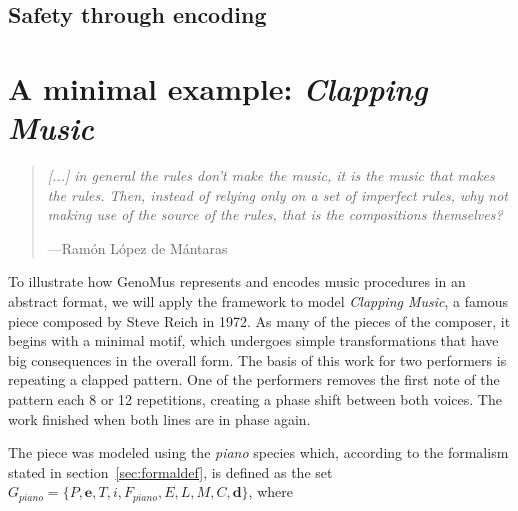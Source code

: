 \documentclass{article}
\renewcommand{\vec}[1]{\mathbf{#1}}
\begin{document}
\subsection{Safety through encoding}








\section{A minimal example: \textsl{Clapping Music}}

\begin{samepage}
\begin{quotation}
\textsl{[...] in general the rules don't make the music, it is the music that makes the rules. Then, instead of relying only on a set of imperfect rules, why not making use of the source of the rules, that is the compositions themselves?
}

---Ram\'{o}n L\'{o}pez de M\'{a}ntaras \cite{LopezdeMantaras:2006:MMA:1565082.1565089}
\end{quotation}
\end{samepage}






To illustrate how GenoMus represents and encodes music procedures in an abstract format, we will apply the framework to model \emph{Clapping Music}, a famous piece composed by Steve Reich in 1972. As many of the pieces of the composer, it begins with a minimal motif, which undergoes simple transformations that have big consequences in the overall form. The basis of this work for two performers is repeating a clapped pattern. One of the performers removes the first note of the pattern each 8 or 12 repetitions, creating a phase shift between both voices. The work finished when both lines are in phase again.

The piece was modeled using the \emph{piano} species which, according to the formalism stated in section~\ref{sec:formaldef}, is defined as the set $G_{piano} = \{P, \vec{e}, T, i, F_{piano}, E, L, M, C, \vec{d}\}$, where
\end{document}
